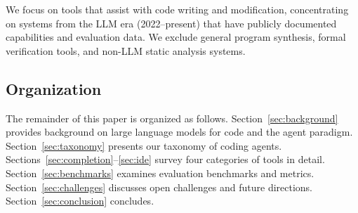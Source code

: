 We focus on tools that assist with code writing and modification, concentrating on systems from the LLM era (2022--present) that have publicly documented capabilities and evaluation data. We exclude general program synthesis, formal verification tools, and non-LLM static analysis systems.

\subsection{Organization}

The remainder of this paper is organized as follows. Section~\ref{sec:background} provides background on large language models for code and the agent paradigm. Section~\ref{sec:taxonomy} presents our taxonomy of coding agents. Sections~\ref{sec:completion}--\ref{sec:ide} survey four categories of tools in detail. Section~\ref{sec:benchmarks} examines evaluation benchmarks and metrics. Section~\ref{sec:challenges} discusses open challenges and future directions. Section~\ref{sec:conclusion} concludes.

